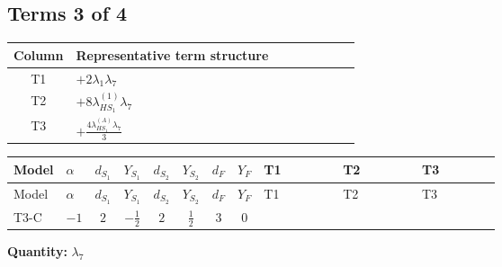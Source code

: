 \documentclass[8pt]{article}
\begin{document}
\begin{landscape}
\subsection*{Terms 3 of 4}
\begin{center}
\begin{tabular}{@{}c >{\raggedright\arraybackslash}p{0.82\linewidth}@{}}
\toprule
Column & Representative term structure \\
\midrule
T1 & \(\displaystyle +2 {\lambda_1} {\lambda_{7}}\) \\
\midrule
T2 & \(\displaystyle +8 {\lambda_{HS_1}^{(1)}} {\lambda_{7}}\) \\
\midrule
T3 & \(\displaystyle +\frac{4 {\lambda_{HS_1}^{(A)}} {\lambda_{7}}}{3}\) \\
\midrule
\bottomrule
\end{tabular}
\end{center}
\smallskip
\tiny
\begin{longtable}{@{}llcccccc >{\raggedright\arraybackslash}p{0.21\linewidth} >{\raggedright\arraybackslash}p{0.21\linewidth} >{\raggedright\arraybackslash}p{0.21\linewidth}@{}}
\toprule
Model & $\alpha$ & $d_{S_1}$ & $Y_{S_1}$ & $d_{S_2}$ & $Y_{S_2}$ & $d_F$ & $Y_F$ & T1 & T2 & T3 \\
\midrule
\endfirsthead
\toprule
Model & $\alpha$ & $d_{S_1}$ & $Y_{S_1}$ & $d_{S_2}$ & $Y_{S_2}$ & $d_F$ & $Y_F$ & T1 & T2 & T3 \\
\midrule
\endhead
T3-C & $-1$ & $2$ & $-\frac{1}{2}$ & $2$ & $\frac{1}{2}$ & $3$ & $0$ & \scriptsize\adjustbox{max width=\linewidth}{$\begin{gathered} +2 {\lambda_1} {\lambda_{7}}\end{gathered}$} & \scriptsize\adjustbox{max width=\linewidth}{$\begin{gathered} +8 {\lambda_{HS_1}^{(1)}} {\lambda_{7}}\end{gathered}$} & \scriptsize\adjustbox{max width=\linewidth}{$\begin{gathered} +\frac{4 {\lambda_{HS_1}^{(A)}} {\lambda_{7}}}{3}\end{gathered}$} \\
\midrule
\bottomrule
\end{longtable}
\clearpage
\noindent\textbf{Quantity: }$\lambda_{7}$\par\smallskip

\end{landscape}
\end{document}

